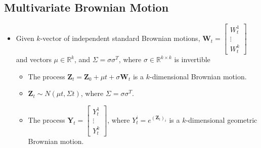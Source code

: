 \documentclass[11pt]{article}
\begin{document}
\subsection{Multivariate Brownian Motion}
\begin{itemize}
    \item Given $k$-vector of independent standard Brownian motions, $\boldsymbol{W}_t = 
    \begin{bmatrix} W_t^1 \\ \vdots \\ W_t^k \end{bmatrix}$ and vectors $\mu \in \mathbb{R}^k$,
    and $\Sigma = \sigma \sigma^T$, where $\sigma \in \mathbb{R}^{k \times k}$ is invertible
    \begin{itemize}
        \item The process $\boldsymbol{Z}_t = \boldsymbol{Z}_0 + \mu t + \sigma 
        \boldsymbol{W}_t$ is a $k$-dimensional Brownian motion. 
        \item $\boldsymbol{Z}_t \sim N (\mu t, \Sigma t)$, where $\Sigma = \sigma \sigma^T$.
        \item The process $\boldsymbol{Y}_t = \begin{bmatrix} Y_t^1 \\ \vdots \\ Y_t^k 
        \end{bmatrix}$, where $Y_t^i = e^{{(\boldsymbol{Z}_t)}_i}$ is a $k$-dimensional 
        geometric Brownian motion. 
    \end{itemize}
\end{itemize}
\end{document}
